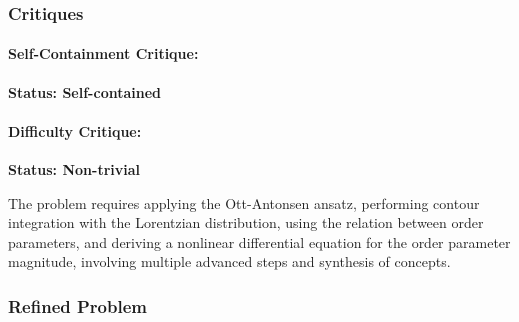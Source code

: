 \documentclass[10pt]{article}
\begin{document}
\subsubsection*{Critiques}
\paragraph*{Self-Containment Critique:}
\textcolor{pass}{\textbf{Status: Self-contained}}




\paragraph*{Difficulty Critique:}
\textcolor{pass}{\textbf{Status: Non-trivial}}

The problem requires applying the Ott-Antonsen ansatz, performing contour integration with the Lorentzian distribution, using the relation between order parameters, and deriving a nonlinear differential equation for the order parameter magnitude, involving multiple advanced steps and synthesis of concepts.


\subsubsection*{Refined Problem}
\end{document}
